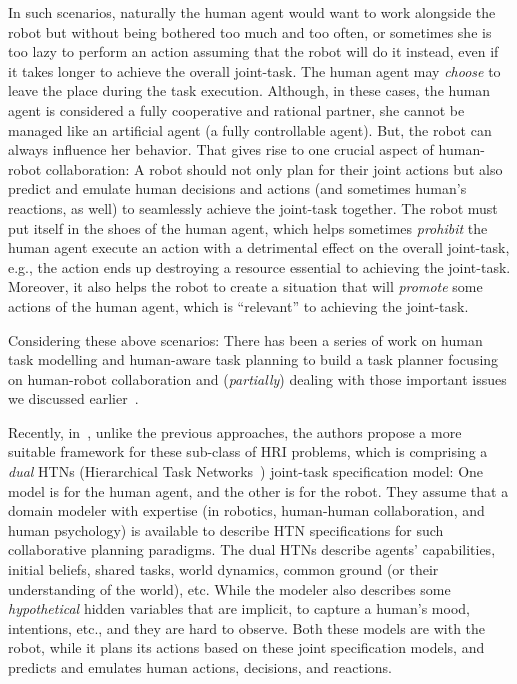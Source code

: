 \documentclass[letterpaper]{article} %
\begin{document}
In such scenarios, naturally the human agent would want to work alongside the robot but without being bothered too much and too often, or sometimes she is too lazy to perform an action assuming that the robot will do it instead, even if it takes longer to achieve the overall joint-task. The human agent may \textit{choose} to leave the place during the task execution. Although, in these cases, the human agent is considered a fully cooperative and rational partner, she cannot be managed like an artificial agent (a fully controllable agent). But, the robot can always influence her behavior. 
That gives rise to one crucial aspect of human-robot collaboration: A robot should not only plan for their joint actions but also predict and emulate human decisions and actions (and sometimes human's reactions, as well) to seamlessly achieve the joint-task together. 
The robot must put itself in the shoes of the human agent, which helps sometimes \textit{prohibit} the human agent execute an action with a detrimental effect on the overall joint-task, e.g., the action ends up destroying a resource essential to achieving the joint-task. 
Moreover, it also helps the robot to create a situation that will \textit{promote} some actions of the human agent, which is ``relevant'' to achieving the joint-task.       


Considering these above scenarios: There has been a series of work on
human task modelling and human-aware task planning to build a task planner focusing on human-robot collaboration and (\textit{partially}) dealing with those important issues we discussed earlier~\cite{alami2006toward,montreuil2007planning,alili2009planning,lallement2014hatp,de2015hatp,lallement2018hatp}.

Recently, in~\cite{BuisanA21,buisan:hal-03684211}, unlike the previous approaches, the authors propose a more suitable framework for these sub-class of HRI problems, which is comprising a \textit{dual} HTNs (Hierarchical Task Networks~\cite{naubooks0014222}) joint-task specification model: One model is for the human agent, and the other is for the robot. 
They assume that a domain modeler with expertise (in robotics, human-human collaboration, and human psychology) is available to describe HTN specifications for such collaborative planning paradigms. The dual HTNs describe agents' capabilities, initial beliefs, shared tasks, world dynamics, common ground (or their understanding of the world), etc. While the modeler also describes some \textit{hypothetical} hidden variables that are implicit, to capture a human's mood, intentions, etc., and they are hard to observe. Both these models are with the robot, while it plans its actions based on these joint specification models, and predicts and emulates human actions, decisions, and reactions.    
\end{document}
